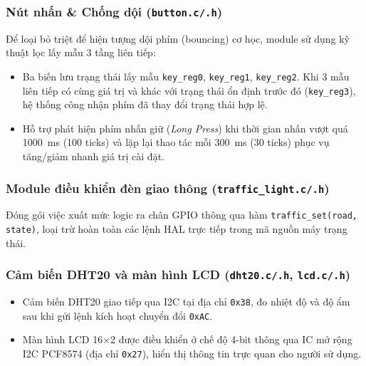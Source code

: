\subsubsection{Nút nhấn \& Chống dội (\texttt{button.c/.h})}
Để loại bỏ triệt để hiện tượng dội phím (bouncing) cơ học, module sử dụng kỹ thuật lọc lấy mẫu 3 tầng liên tiếp:
\begin{itemize}
    \item Ba biến lưu trạng thái lấy mẫu \texttt{key\_reg0}, \texttt{key\_reg1}, \texttt{key\_reg2}. Khi 3 mẫu liên tiếp có cùng giá trị và khác với trạng thái ổn định trước đó (\texttt{key\_reg3}), hệ thống công nhận phím đã thay đổi trạng thái hợp lệ.
    \item Hỗ trợ phát hiện phím nhấn giữ (\textit{Long Press}) khi thời gian nhấn vượt quá 1000~ms (100 ticks) và lặp lại thao tác mỗi 300~ms (30 ticks) phục vụ tăng/giảm nhanh giá trị cài đặt.
\end{itemize}

\subsubsection{Module điều khiển đèn giao thông (\texttt{traffic\_light.c/.h})}
Đóng gói việc xuất mức logic ra chân GPIO thông qua hàm \texttt{traffic\_set(road, state)}, loại trừ hoàn toàn các lệnh HAL trực tiếp trong mã nguồn máy trạng thái.

\subsubsection{Cảm biến DHT20 và màn hình LCD (\texttt{dht20.c/.h}, \texttt{lcd.c/.h})}
\begin{itemize}
    \item Cảm biến DHT20 giao tiếp qua I2C tại địa chỉ \texttt{0x38}, đo nhiệt độ và độ ẩm sau khi gửi lệnh kích hoạt chuyển đổi \texttt{0xAC}.
    \item Màn hình LCD 16$\times$2 được điều khiển ở chế độ 4-bit thông qua IC mở rộng I2C PCF8574 (địa chỉ \texttt{0x27}), hiển thị thông tin trực quan cho người sử dụng.
\end{itemize}


